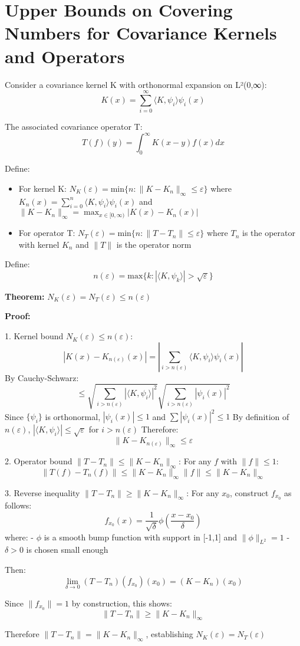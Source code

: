 \documentclass{article}
\begin{document}
\section*{Upper Bounds on Covering Numbers for Covariance Kernels and Operators}

Consider a covariance kernel K with orthonormal expansion on L²(0,∞):
\[K(x) = \sum_{i=0}^{\infty} \langle K,\psi_i \rangle \psi_i(x)\]

The associated covariance operator T:
\[T(f)(y) = \int_0^{\infty} K(x-y)f(x)dx\]

Define:
\begin{itemize}
\item For kernel K:
   $N_K(\varepsilon) = \text{min}\{n : \|K - K_n\|_{\infty} \leq \varepsilon\}$
   where $K_n(x) = \sum_{i=0}^n \langle K,\psi_i \rangle \psi_i(x)$
   and $\|K - K_n\|_{\infty} = \max_{x \in [0,\infty)} |K(x) - K_n(x)|$

\item For operator T:
   $N_T(\varepsilon) = \text{min}\{n : \|T - T_n\| \leq \varepsilon\}$
   where $T_n$ is the operator with kernel $K_n$
   and $\|T\|$ is the operator norm
\end{itemize}

Define:
\[n(\varepsilon) = \text{max}\{k : |\langle K,\psi_k \rangle| > \sqrt{\varepsilon}\}\]

\textbf{Theorem:} $N_K(\varepsilon) = N_T(\varepsilon) \leq n(\varepsilon)$

\textbf{Proof:}

1. Kernel bound $N_K(\varepsilon) \leq n(\varepsilon)$:
   \[|K(x) - K_{n(\varepsilon)}(x)| = |\sum_{i>n(\varepsilon)} \langle K,\psi_i \rangle \psi_i(x)|\]
   By Cauchy-Schwarz:
   \[\leq \sqrt{\sum_{i>n(\varepsilon)} |\langle K,\psi_i \rangle|^2} \sqrt{\sum_{i>n(\varepsilon)} |\psi_i(x)|^2}\]
   Since $\{\psi_i\}$ is orthonormal, $|\psi_i(x)| \leq 1$ and $\sum |\psi_i(x)|^2 \leq 1$
   By definition of $n(\varepsilon)$, $|\langle K,\psi_i \rangle| \leq \sqrt{\varepsilon}$ for $i > n(\varepsilon)$
   Therefore:
   \[\|K - K_{n(\varepsilon)}\|_{\infty} \leq \varepsilon\]

2. Operator bound $\|T - T_n\| \leq \|K - K_n\|_{\infty}$:
   For any $f$ with $\|f\| \leq 1$:
   \[\|T(f) - T_n(f)\| \leq \|K - K_n\|_{\infty} \|f\| \leq \|K - K_n\|_{\infty}\]

3. Reverse inequality $\|T - T_n\| \geq \|K - K_n\|_{\infty}$:
   For any $x_0$, construct $f_{x_0}$ as follows:
   \[f_{x_0}(x) = \frac{1}{\sqrt{\delta}}\phi(\frac{x-x_0}{\delta})\]
   where:
   - $\phi$ is a smooth bump function with support in [-1,1] and $\|\phi\|_{L^2} = 1$
   - $\delta > 0$ is chosen small enough

   Then:
   \[\lim_{\delta \to 0} (T - T_n)(f_{x_0})(x_0) = (K - K_n)(x_0)\]
   
   Since $\|f_{x_0}\| = 1$ by construction, this shows:
   \[\|T - T_n\| \geq \|K - K_n\|_{\infty}\]

Therefore $\|T - T_n\| = \|K - K_n\|_{\infty}$, establishing $N_K(\varepsilon) = N_T(\varepsilon)$
\end{document}
